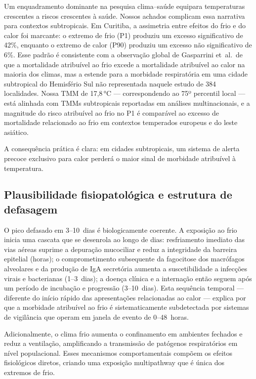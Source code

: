 \documentclass[12pt]{article}
\begin{document}
Um enquadramento dominante na pesquisa clima--saúde equipara
temperaturas crescentes a riscos crescentes à saúde. Nossos achados
complicam essa narrativa para contextos subtropicais. Em Curitiba, a
assimetria entre efeitos do frio e do calor foi marcante: o extremo
de frio (P1) produziu um excesso significativo de 42\%, enquanto o
extremo de calor (P90) produziu um excesso não significativo de 6\%.
Esse padrão é consistente com a observação global de Gasparrini
et~al.\ de que a mortalidade atribuível ao frio excede a mortalidade
atribuível ao calor na maioria dos climas, mas a estende para a
morbidade respiratória em uma cidade subtropical do Hemisfério Sul
não representada naquele estudo de 384 localidades. Nossa TMM de
17,8\,°C --- correspondendo ao 75º percentil local --- está alinhada
com TMMs subtropicais reportadas em análises multinacionais, e a
magnitude do risco atribuível ao frio no P1 é comparável ao excesso
de mortalidade relacionado ao frio em contextos temperados europeus
e do leste asiático.

A consequência prática é clara: em cidades subtropicais, um sistema
de alerta precoce exclusivo para calor perderá o maior sinal de
morbidade atribuível à temperatura.

\subsection{Plausibilidade fisiopatológica e estrutura de defasagem}

O pico defasado em 3--10~dias é biologicamente coerente. A exposição
ao frio inicia uma cascata que se desenrola ao longo de dias:
resfriamento imediato das vias aéreas suprime a depuração mucociliar
e reduz a integridade da barreira epitelial (horas); o comprometimento
subsequente da fagocitose dos macrófagos alveolares e da produção de
IgA secretória aumenta a suscetibilidade a infecções virais e
bacterianas (1--3~dias); a doença clínica e a internação então seguem
após um período de incubação e progressão (3--10~dias). Esta sequência
temporal --- diferente do início rápido das apresentações relacionadas
ao calor --- explica por que a morbidade atribuível ao frio é
sistematicamente subdetectada por sistemas de vigilância que operam
em janela de evento de 0--48~horas.

Adicionalmente, o clima frio aumenta o confinamento em ambientes
fechados e reduz a ventilação, amplificando a transmissão de
patógenos respiratórios em nível populacional. Esses mecanismos
comportamentais compõem os efeitos fisiológicos diretos, criando
uma exposição multipathway que é única dos extremos de frio.
\end{document}
